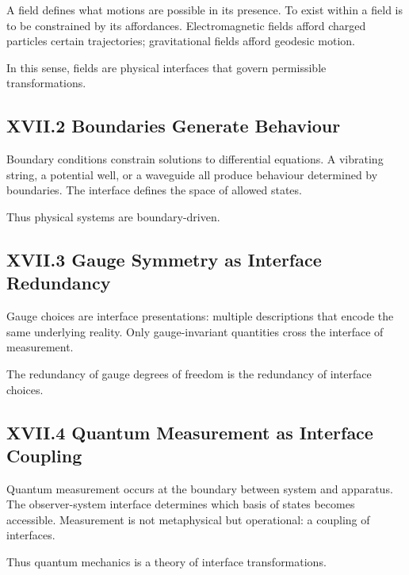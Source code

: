 \documentclass[11pt,letterpaper]{article}
\begin{document}
A field defines what motions are possible in its presence. To exist within a field is to be constrained by its affordances. Electromagnetic fields afford charged particles certain trajectories; gravitational fields afford geodesic motion.

In this sense, fields are physical interfaces that govern permissible transformations.

\subsection{XVII.2 Boundaries Generate Behaviour}

Boundary conditions constrain solutions to differential equations. A vibrating string, a potential well, or a waveguide all produce behaviour determined by boundaries. The interface defines the space of allowed states.

Thus physical systems are boundary-driven.

\subsection{XVII.3 Gauge Symmetry as Interface Redundancy}

Gauge choices are interface presentations: multiple descriptions that encode the same underlying reality. Only gauge-invariant quantities cross the interface of measurement.

The redundancy of gauge degrees of freedom is the redundancy of interface choices.

\subsection{XVII.4 Quantum Measurement as Interface Coupling}

Quantum measurement occurs at the boundary between system and apparatus. The observer-system interface determines which basis of states becomes accessible. Measurement is not metaphysical but operational: a coupling of interfaces.

Thus quantum mechanics is a theory of interface transformations.
\end{document}
